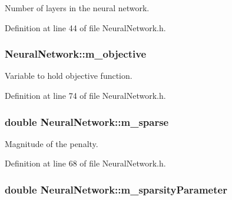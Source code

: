 Number of layers in the neural network. 



Definition at line 44 of file Neural\+Network.\+h.

\subsubsection[{\texorpdfstring{m\+\_\+objective}{m_objective}}]{ Neural\+Network\+::m\+\_\+objective\hspace{0.3cm}{\ttfamily [protected]}}\hypertarget{classNeuralNetwork_a296fef6f667d2bcf1080a16c8c3aceb2}{}\label{classNeuralNetwork_a296fef6f667d2bcf1080a16c8c3aceb2}


Variable to hold objective function. 



Definition at line 74 of file Neural\+Network.\+h.

\subsubsection[{\texorpdfstring{m\+\_\+sparse}{m_sparse}}]{\setlength{\rightskip}{0pt plus 5cm}double Neural\+Network\+::m\+\_\+sparse\hspace{0.3cm}{\ttfamily [protected]}}\hypertarget{classNeuralNetwork_a5ff4dd9b7b90474cce090c37d7127366}{}\label{classNeuralNetwork_a5ff4dd9b7b90474cce090c37d7127366}


Magnitude of the penalty. 



Definition at line 68 of file Neural\+Network.\+h.

\subsubsection[{\texorpdfstring{m\+\_\+sparsity\+Parameter}{m_sparsityParameter}}]{\setlength{\rightskip}{0pt plus 5cm}double Neural\+Network\+::m\+\_\+sparsity\+Parameter\hspace{0.3cm}{\ttfamily [protected]}}\hypertarget{classNeuralNetwork_ac6e586b8ab49ef7ca1f07dab6f197f6c}{}\label{classNeuralNetwork_ac6e586b8ab49ef7ca1f07dab6f197f6c}


